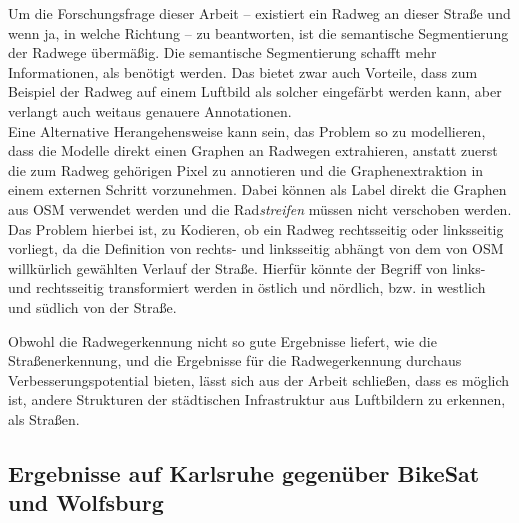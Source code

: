 \begin{enumerate}
	Um die Forschungsfrage dieser Arbeit -- existiert ein Radweg an dieser Straße und wenn ja, in welche Richtung -- 
	zu beantworten, ist die semantische Segmentierung der Radwege übermäßig. Die semantische Segmentierung 
	schafft mehr Informationen, als benötigt werden. Das bietet zwar auch Vorteile, dass zum Beispiel der Radweg 
	auf einem Luftbild als solcher eingefärbt werden kann, aber verlangt auch weitaus genauere Annotationen. \\
	Eine Alternative Herangehensweise kann sein, das Problem so zu modellieren, dass die Modelle direkt einen Graphen
	an Radwegen extrahieren, anstatt zuerst die zum Radweg gehörigen Pixel zu annotieren und die Graphenextraktion 
	in einem externen Schritt vorzunehmen. Dabei können als Label direkt die Graphen aus \ac{OSM} verwendet werden 
	und die Rad\textit{streifen} müssen nicht verschoben werden. Das Problem hierbei ist, zu Kodieren, ob 
	ein Radweg rechtsseitig oder linksseitig vorliegt, da die Definition von rechts- und linksseitig abhängt  
	von dem von \ac{OSM} willkürlich gewählten Verlauf der Straße. Hierfür könnte der Begriff von links- und 
	rechtsseitig transformiert werden in östlich und nördlich, bzw. in westlich und südlich von der Straße.    
\end{enumerate}
Obwohl die Radwegerkennung nicht so gute Ergebnisse liefert, wie die Straßenerkennung, und die Ergebnisse 
für die Radwegerkennung durchaus Verbesserungspotential bieten, lässt sich aus der Arbeit 
schließen, dass es möglich ist, andere Strukturen der städtischen Infrastruktur aus Luftbildern zu erkennen, 
als Straßen. 

\subsection{Ergebnisse auf Karlsruhe gegenüber BikeSat und Wolfsburg}

